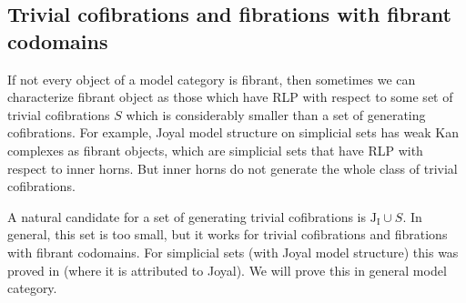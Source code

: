 \documentclass[reqno]{amsart}
\theoremstyle{definition}
\newcommand{\I}{\mathrm{I}}
\newcommand{\J}{\mathrm{J}}
\begin{document}
\subsection{Trivial cofibrations and fibrations with fibrant codomains}

If not every object of a model category is fibrant, then sometimes we can characterize fibrant object as those which have
RLP with respect to some set of trivial cofibrations $S$ which is considerably smaller than a set of generating cofibrations.
For example, Joyal model structure on simplicial sets has weak Kan complexes as fibrant objects,
which are simplicial sets that have RLP with respect to inner horns.
But inner horns do not generate the whole class of trivial cofibrations.

A natural candidate for a set of generating trivial cofibrations is $\J_\I \cup S$.
In general, this set is too small, but it works for trivial cofibrations and fibrations with fibrant codomains.
For simplicial sets (with Joyal model structure) this was proved in \cite{lurie-topos} (where it is attributed to Joyal).
We will prove this in general model category.
\end{document}
